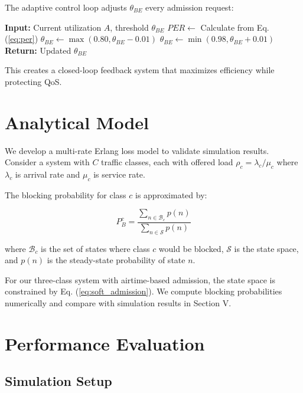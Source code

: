 \documentclass[conference]{IEEEtran}
\begin{document}
The adaptive control loop adjusts $\theta_{BE}$ every admission request:

\begin{algorithm}[H]
\caption{AS-CAC+ Adaptive Threshold Adjustment}
\label{alg:ascac_plus}
\begin{algorithmic}[1]
\STATE \textbf{Input:} Current utilization $A$, threshold $\theta_{BE}$
\STATE $PER \gets$ Calculate from Eq. (\ref{eq:per})
    \STATE $\theta_{BE} \gets \max(0.80, \theta_{BE} - 0.01)$ 
    \STATE $\theta_{BE} \gets \min(0.98, \theta_{BE} + 0.01)$ 
\ENDIF
\STATE \textbf{Return:} Updated $\theta_{BE}$
\end{algorithmic}
\end{algorithm}

This creates a closed-loop feedback system that maximizes efficiency while protecting QoS.

\section{Analytical Model}

We develop a multi-rate Erlang loss model to validate simulation results. Consider a system with $C$ traffic classes, each with offered load $\rho_c = \lambda_c / \mu_c$ where $\lambda_c$ is arrival rate and $\mu_c$ is service rate.

The blocking probability for class $c$ is approximated by:

\begin{equation}
P_B^c = \frac{\sum_{n \in \mathcal{B}_c} p(n)}{\sum_{n \in \mathcal{S}} p(n)}
\label{eq:erlang_blocking}
\end{equation}

where $\mathcal{B}_c$ is the set of states where class $c$ would be blocked, $\mathcal{S}$ is the state space, and $p(n)$ is the steady-state probability of state $n$.

For our three-class system with airtime-based admission, the state space is constrained by Eq. (\ref{eq:soft_admission}). We compute blocking probabilities numerically and compare with simulation results in Section V.

\section{Performance Evaluation}

\subsection{Simulation Setup}
\end{document}
